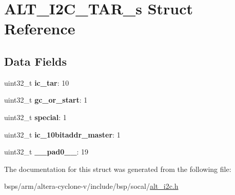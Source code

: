 \hypertarget{structALT__I2C__TAR__s}{}\section{A\+L\+T\+\_\+\+I2\+C\+\_\+\+T\+A\+R\+\_\+s Struct Reference}
\label{structALT__I2C__TAR__s}
\subsection*{Data Fields}
\begin{DoxyCompactItemize}
\item 
\mbox{\label{structALT__I2C__TAR__s_afddd6b0756367fe5279283ed2277b5e6}} 
uint32\+\_\+t {\bfseries ic\+\_\+tar}\+: 10
\item 
\mbox{\label{structALT__I2C__TAR__s_a31fa2f787d6a34cca6a68d6f1502a027}} 
uint32\+\_\+t {\bfseries gc\+\_\+or\+\_\+start}\+: 1
\item 
\mbox{\label{structALT__I2C__TAR__s_a69427f87303d53d79320c682cb6b251c}} 
uint32\+\_\+t {\bfseries special}\+: 1
\item 
\mbox{\label{structALT__I2C__TAR__s_a4ef57f1222ad4728e561c973a2c3c22a}} 
uint32\+\_\+t {\bfseries ic\+\_\+10bitaddr\+\_\+master}\+: 1
\item 
\mbox{\label{structALT__I2C__TAR__s_a12f8a560c5b4198b8faf6998c2ddd807}} 
uint32\+\_\+t {\bfseries \+\_\+\+\_\+pad0\+\_\+\+\_\+}\+: 19
\end{DoxyCompactItemize}


The documentation for this struct was generated from the following file\+:\begin{DoxyCompactItemize}
\item 
bsps/arm/altera-\/cyclone-\/v/include/bsp/socal/\mbox{\hyperlink{socal_2alt__i2c_8h}{alt\+\_\+i2c.\+h}}\end{DoxyCompactItemize}
